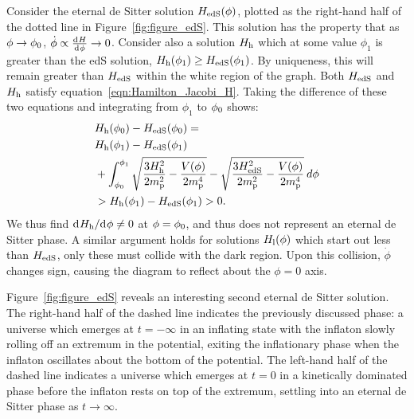Consider the eternal de Sitter solution \(H_\mathrm{edS}(\phi)\), plotted as the right-hand half of the dotted line in Figure~\ref{fig:figure_edS}.  This solution has the property that as \(\phi\to\phi_0\), \(\dot{\phi}\propto\frac{\operatorname{d}^{}\!{H}}{\operatorname{d}^{}\!{\phi}}\to0\). Consider also a solution \(H_\mathrm{h}\) which at some value \(\phi_1\) is greater than the edS solution, \(H_\mathrm{h}(\phi_1) \ge H_\mathrm{edS}(\phi_1)\). By uniqueness, this will remain greater than \(H_\mathrm{edS}\) within the white region of the graph. Both \(H_\mathrm{edS}\) and \(H_\mathrm{h}\) satisfy equation~\eqref{eqn:Hamilton_Jacobi_H}.  Taking the difference of these two equations and integrating from \(\phi_1\) to \(\phi_0\) shows:
%
\begin{align}
  &H_\mathrm{h}(\phi_0)-H_\mathrm{edS}(\phi_0)= \nonumber\\
  &H_\mathrm{h}(\phi_1)-H_\mathrm{edS}(\phi_1) \nonumber\\
  & + \int_{\phi_0}^{\phi_1} 
  \sqrt{\frac{3H_\mathrm{h}^2}{2m_{\mathrm{p}}^2} - 
  \frac{V(\phi)}{2m_{\mathrm{p}}^4}}-\sqrt{\frac{3H_\mathrm{edS}^2}{2m_{\mathrm{p}}^2} - 
  \frac{V(\phi)}{2m_{\mathrm{p}}^4}}\:d\phi \nonumber \\
  &>H_\mathrm{h}(\phi_1)-H_\mathrm{edS}(\phi_1)>0.
\end{align}
%
We thus find \({\operatorname{d}^{}\!{H_\mathrm{h}}}/{\operatorname{d}^{}\!{\phi}}\ne0\) at \(\phi=\phi_0\), and thus does not represent an eternal de Sitter phase. A similar argument holds for solutions \(H_\mathrm{l}(\phi)\) which start out less than \(H_\mathrm{edS}\), only these must collide with the dark region. Upon this collision, \(\dot{\phi}\) changes sign, causing the diagram to reflect about the \(\phi=0\) axis.

Figure~\ref{fig:figure_edS} reveals an interesting second eternal de Sitter solution. The right-hand half of the dashed line indicates the previously discussed phase: a universe which emerges at \(t=-\infty\) in an inflating state with the inflaton slowly rolling off an extremum in the potential, exiting the inflationary phase when the inflaton oscillates about the bottom of the potential.  The left-hand half of the dashed line indicates a universe which emerges at \(t=0\) in a kinetically dominated phase before the inflaton rests on top of the extremum, settling into an eternal de Sitter phase as \(t\to\infty\).

